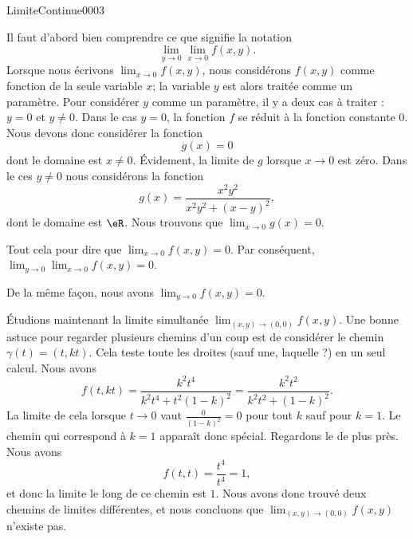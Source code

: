 \begin{corrige}{LimiteContinue0003}

	Il faut d'abord bien comprendre ce que signifie la notation
	\begin{equation}
		\lim_{y\to 0} \lim_{x\to 0} f(x,y).
	\end{equation}
	Lorsque nous écrivons $\lim_{x\to 0} f(x,y)$, nous considérons $f(x,y)$ comme fonction de la seule variable $x$; la variable $y$ est alors traitée comme un paramètre. Pour considérer $y$ comme un paramètre, il y a deux cas à traiter : $y=0$ et $y\neq 0$. Dans le cas $y=0$, la fonction $f$ se réduit à la fonction constante $0$. Nous devons donc considérer la fonction
	\begin{equation}
		g(x)=0
	\end{equation}
	dont le domaine est $x\neq 0$. Évidement, la limite de $g$ lorsque $x\to 0$ est zéro. Dans le ces $y\neq 0$ nous considérons la fonction
	\begin{equation}
		g(x)=\frac{ x^2y^2 }{ x^2y^2+(x-y)^2 },
	\end{equation}
	dont le domaine est $\eR$. Nous trouvons que $\lim_{x\to 0} g(x)=0$.

	Tout cela pour dire que $\lim_{x\to 0} f(x,y)=0$. Par conséquent, $\lim_{y\to 0} \lim_{x\to 0} f(x,y)=0$.

	De la même façon, nous avons $\lim_{y\to 0} f(x,y)=0$.

	Étudions maintenant la limite simultanée $\lim_{(x,y)\to(0,0)}f(x,y)$. Une bonne astuce pour regarder plusieurs chemins d'un coup est de considérer le chemin $\gamma(t)=(t,kt)$. Cela teste toute les droites (sauf une, laquelle ?) en un seul calcul. Nous avons
	\begin{equation}
		f(t,kt)=\frac{ k^2t^4 }{ k^2t^4+t^2(1-k)^2 }=\frac{ k^2t^2 }{ k^2t^2+(1-k)^2 }.
	\end{equation}
	La limite de cela lorsque $t\to 0$ vaut $\frac{ 0 }{ (1-k)^2 }=0$ pour tout $k$ sauf pour $k=1$. Le chemin qui correspond à $k=1$ apparaît donc spécial. Regardons le de plus près. Nous avons
	\begin{equation}
		f(t,t)=\frac{ t^4 }{ t^4 }=1,
	\end{equation}
	et donc la limite le long de ce chemin est $1$. Nous avons donc trouvé deux chemins de limites différentes, et nous concluons que $\lim_{(x,y)\to(0,0)}f(x,y)$ n'existe pas.
\end{corrige}


